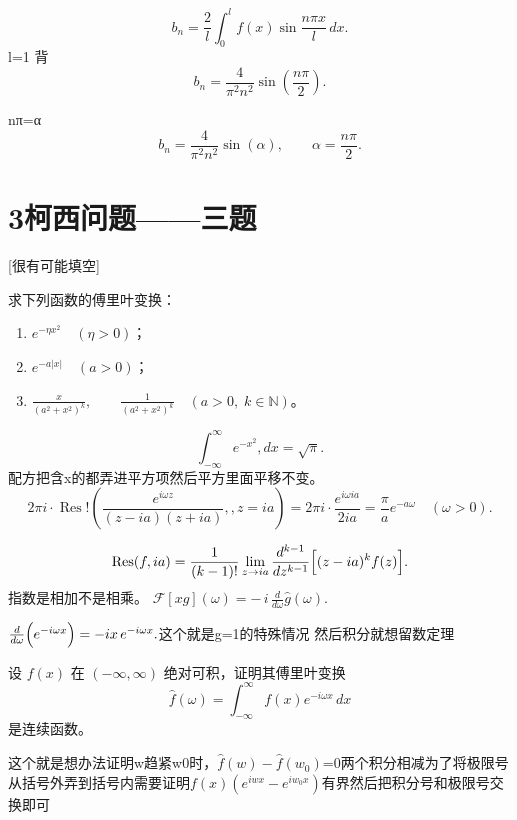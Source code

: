 \begin{dxtips}
    $$b_n=\frac{2}{l}\int_{0}^{l} f(x)\sin\frac{n\pi x}{l}\,dx.$$l=1
    背$$b_n=\frac{4}{\pi^2 n^2}\sin\left(\frac{n\pi}{2}\right).$$
\end{dxtips}
\begin{dxtips}
    nπ=α\[
b_n=\frac{4}{\pi^2 n^2}\sin(\alpha),\qquad \alpha=\frac{n\pi}{2}.
\]
\end{dxtips}
\section{3柯西问题——三题}
[很有可能填空]

\begin{homework}[1]
求下列函数的傅里叶变换：
\begin{enumerate}[(1)]
  \item $e^{-\eta x^2}\quad(\eta>0)$；
  \item $e^{-a|x|}\quad(a>0)$；
  \item $\displaystyle\frac{x}{(a^2+x^2)^k},\qquad
        \frac1{(a^2+x^2)^k}\quad(a>0,\;k\in\mathbb N)$。
\end{enumerate}
\end{homework}
\begin{dxtips}
$$\int_{-\infty}^{\infty} e^{-x^{2}},dx=\sqrt{\pi}.$$
配方把含x的都弄进平方项然后平方里面平移不变。
$$2\pi i\cdot \operatorname{Res}!\left(\frac{e^{i\omega z}}{(z-ia)(z+ia)},,z=ia\right)
=2\pi i\cdot \frac{e^{i\omega ia}}{2ia}
=\frac{\pi}{a}e^{-a\omega}\quad(\omega>0).$$

$$\operatorname{Res}(f,ia)=\frac{1}{(k-1)!}\lim_{z\to ia}\frac{d^{k-1}}{dz^{k-1}}
\Bigl[(z-ia)^{k}f(z)\Bigr].$$
    指数是相加不是相乘。
    $
\mathcal F[xg](\omega)= -\,i\,\frac{d}{d\omega}\hat g(\omega).
$

$
\frac{d}{d\omega}\Bigl(e^{-i\omega x}\Bigr)=-ix\,e^{-i\omega x}.
$这个就是g=1的特殊情况
然后积分就想留数定理
\end{dxtips}
\begin{homework}[2]
设 $f(x)$ 在 $(-\infty,\infty)$ 绝对可积，证明其傅里叶变换
\[
\hat f(\omega)=\int_{-\infty}^{\infty}f(x)e^{-i\omega x}\,dx
\]
是连续函数。
\end{homework}
\begin{dxtips}
    这个就是想办法证明w趋紧w0时，$\hat{f}(w)-\hat{f}(w_0)$=0两个积分相减为了将极限号从括号外弄到括号内需要证明$f(x)(e^{iwx}-e^{iw_0x})$有界然后把积分号和极限号交换即可
\end{dxtips}


